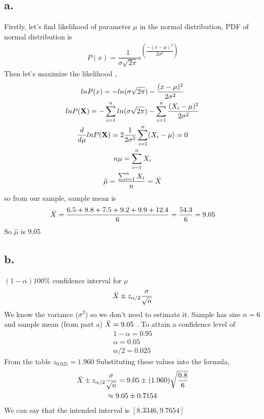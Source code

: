 \documentclass[12pt]{article}
\begin{document}
\subsection*{a.}
Firstly, let's find likelihood of parameter $\mu$ in the normal distribution, PDF of normal distribution is 
\begin{gather*}
P(x) = \dfrac{1}{\sigma \sqrt{2\pi}}e^{(\dfrac{-(x-\mu)^2}{2\sigma ^2})}
\end{gather*}
Then let's maximize the likelihood , 
\begin{gather*}
    lnP(x) = -ln(\sigma \sqrt{2\pi})-\dfrac{(x-\mu)^2}{2\sigma ^2} \\
    lnP(\textbf{X}) = -\sum_{i=1}^n ln(\sigma \sqrt{2\pi}) - \sum_{i=1}^n \dfrac{(X_i-\mu)^2}{2\sigma ^2} \\
    \dfrac{d}{d \mu}lnP(\textbf{X}) = 2 \dfrac{1}{2\sigma^2} \sum_{i=1}^n (X_i-\mu) = 0 \\
    n \mu =   \sum_{i=1}^n X_i \\
    \hat{\mu} = \dfrac{\sum_{i=1}^n X_i}{n} = \Bar{X}
\end{gather*}
so from our sample, sample mean is 
\begin{gather*}
    \Bar{X} = \dfrac{6.5+8.8+7.5+9.2+9.9+12.4}{6} = \dfrac{54.3}{6} = 9.05
\end{gather*}
So $\hat{\mu}$ is 9.05
\subsection*{b.}
$(1-\alpha)100\%$ confidence interval for $\mu$ 
\begin{gather*}
    \Bar{X} \pm z_{\alpha/2} \dfrac{\sigma}{\sqrt{n}}
\end{gather*}
We know the variance ($\sigma ^2$) so we don't need to estimate it. Sample has size $n = 6$ and sample mean (from part a) $\Bar{X} = 9.05$ . To attain a confidence level of 
\begin{gather*}
    1 - \alpha = 0.95 \\
    \alpha = 0.05 \\
    \alpha / 2 = 0.025
\end{gather*}
From the table $z_{0.025} = 1.960$ Substituting these values into the formula, 
\begin{gather*}
    \Bar{X} \pm z_{\alpha/2} \dfrac{\sigma}{\sqrt{n}} = 9.05 \pm (1.960) \sqrt{\dfrac{0.8}{6}} \\
    \approx 9.05 \pm 0.7154
\end{gather*}
We can say that the intended interval is $[8.3346,9.7654]$
\end{document}
